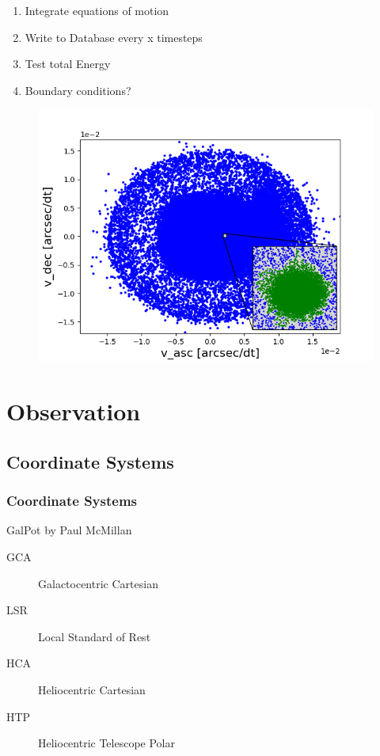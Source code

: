 \documentclass{beamer}
\begin{document}
\begin{frame}
\begin{enumerate}
\item<1-> Integrate equations of motion
\item<2-> Write to Database every x timesteps
\item<3-> Test total Energy
\item<4-> Boundary conditions?
\end{enumerate}
\end{frame}


\begin{frame}
\begin{figure}
\centering
\includegraphics[width=\textwidth,height=0.8\textheight,keepaspectratio]{Images/title_page.png}
\end{figure}
\end{frame}

\section{Observation}

\subsection{Coordinate Systems}

\begin{frame}
\frametitle{Coordinate Systems}

GalPot by Paul McMillan
\\[2ex]
\begin{description}
\item[GCA] Galactocentric Cartesian
\item[LSR] Local Standard of Rest
\item[HCA] Heliocentric Cartesian
\item[HTP] Heliocentric Telescope Polar
\end{description}

\end{frame}
\end{document}

